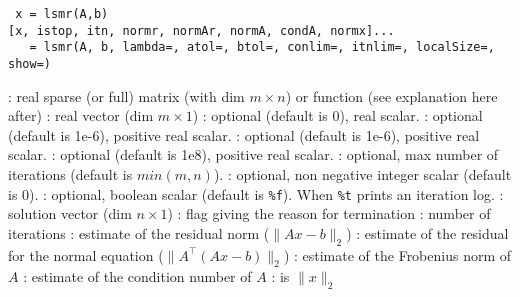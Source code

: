
\begin{mandesc}
\end{mandesc}
\begin{calling_sequence}
\begin{verbatim}
 x = lsmr(A,b)
[x, istop, itn, normr, normAr, normA, condA, normx]...
   = lsmr(A, b, lambda=, atol=, btol=, conlim=, itnlim=, localSize=, show=)
\end{verbatim}
\end{calling_sequence}
\begin{parameters}
  \begin{varlist}
    : real sparse (or full) matrix (with dim $m \times n$) or
               function (see explanation here after)
    : real vector (dim $m \times 1$) 
    : optional (default is 0), real scalar.
    : optional (default is 1e-6), positive real scalar.
    : optional (default is 1e-6), positive real scalar.
    : optional (default is 1e8), positive real scalar.
    : optional, max number of iterations (default is $min(m,n)$).
    : optional, non negative integer scalar (default is 0).
    : optional, boolean scalar (default is \verb+%f+). When \verb+%t+
                   prints an iteration log.
    : solution vector (dim $n \times 1$)
    : flag giving the reason for termination
    : number of iterations
    : estimate of the residual norm ($\|Ax-b\|_2$)
    : estimate of the residual for the normal equation ($\|A^{\top}(Ax-b)\|_2$)
    : estimate of the Frobenius norm of $A$
    : estimate of the condition number of $A$
    : is $\|x\|_2$
  \end{varlist}
\end{parameters}

